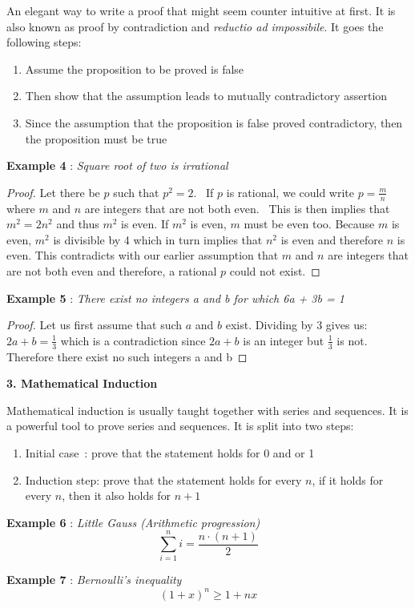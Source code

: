 \noindent An elegant way to write a proof that might seem counter intuitive at first. It is also known as proof by contradiction and \textit{reductio ad impossibile}. It goes the following steps:
\begin{enumerate}
\item Assume the proposition to be proved is false
\item Then show that the assumption leads to mutually contradictory assertion
\item Since the assumption that the proposition is false proved contradictory, then the proposition must be true
\end{enumerate}

\noindent\textbf{Example 4} : \textit{Square root of two is irrational}
\begin{proof}
Let there be $p$ such that $p^2=2$. 
If $p$ is rational, we could write $p = \frac{m}{n}$ where $m$ and $n$ are integers that are not both even. 
This is then implies that $m^2=2n^2$ and thus $m^2$ is even. If $m^2$ is even, $m$ must be even too. Because $m$ is even, $m^2$ is divisible by 4 which in turn implies that $n^2$ is even and therefore $n$ is even.
This contradicts with our earlier assumption that $m$ and $n$ are integers that are not both even and therefore, a rational $p$ could not exist.
\end{proof}

\noindent\textbf{Example 5} : \textit{There exist no integers a and b for which 6a + 3b = 1}
\begin{proof}
Let us first assume that such $a$ and $b$ exist.
Dividing by 3 gives us: $2a+b=\frac{1}{3}$
which is a contradiction since $2a+b$ is an integer but $\frac{1}{3}$ is not. Therefore there exist no such integers a and b
\end{proof}

\noindent \textbf{3. Mathematical Induction}

\noindent Mathematical induction is usually taught together with series and sequences. It is a powerful tool to prove series and sequences. It is split into two steps:
\begin{enumerate}
\item Initial case : prove that the statement holds for 0 and or 1
\item Induction step: prove that the statement holds for every $n$, if it holds for every $n$, then it also holds for $n+1$
\end{enumerate}

\noindent\textbf{Example 6} : \textit{Little Gauss (Arithmetic progression)}
\begin{equation}
\sum_{i=1}^n i= \frac{n\cdot(n+1)}{2}
\end{equation}

\noindent\textbf{Example 7} : \textit{Bernoulli's inequality}
\begin{equation}
(1+x)^n \ge 1+nx
\end{equation}
